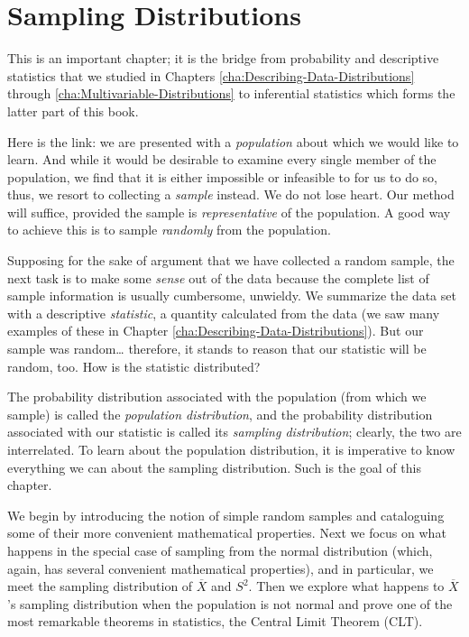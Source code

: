 \documentclass[captions=tableheading]{scrbook}
\begin{document}
\chapter{Sampling Distributions}
\label{sec-8}

\label{cha:Sampling-Distributions}


\noindent This is an important chapter; it is the bridge from probability and descriptive statistics that we studied in Chapters \ref{cha:Describing-Data-Distributions} through \ref{cha:Multivariable-Distributions} to inferential statistics which forms the latter part of this book.

Here is the link: we are presented with a \emph{population} about which we would like to learn. And while it would be desirable to examine every single member of the population, we find that it is either impossible or infeasible to for us to do so, thus, we resort to collecting a \emph{sample} instead. We do not lose heart. Our method will suffice, provided the sample is \emph{representative} of the population. A good way to achieve this is to sample \emph{randomly} from the population.

Supposing for the sake of argument that we have collected a random sample, the next task is to make some \emph{sense} out of the data because the complete list of sample information is usually cumbersome, unwieldy. We summarize the data set with a descriptive \emph{statistic}, a quantity calculated from the data (we saw many examples of these in Chapter \ref{cha:Describing-Data-Distributions}). But our sample was random\ldots{} therefore, it stands to reason that our statistic will be random, too. How is the statistic distributed?

The probability distribution associated with the population (from which we sample) is called the \emph{population distribution}, and the probability distribution associated with our statistic is called its \emph{sampling distribution}; clearly, the two are interrelated. To learn about the population distribution, it is imperative to know everything we can about the sampling distribution. Such is the goal of this chapter.

We begin by introducing the notion of simple random samples and cataloguing some of their more convenient mathematical properties. Next we focus on what happens in the special case of sampling from the normal distribution (which, again, has several convenient mathematical properties), and in particular, we meet the sampling distribution of \(\overline{X}\) and \(S^{2}\). Then we explore what happens to \(\overline{X}\)'s sampling distribution when the population is not normal and prove one of the most remarkable theorems in statistics, the Central Limit Theorem (CLT).
\end{document}
